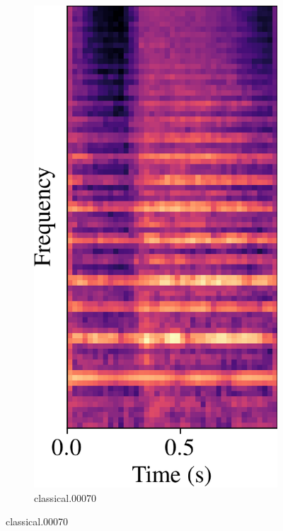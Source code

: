\documentclass[conference]{IEEEtran}
\begin{document}
\begin{figure}[htbp]
    \centering
    \begin{subfigure}[b]{0.32\columnwidth}
        \centerline{\includegraphics[width=\columnwidth]{spec_correct.png}}
        \caption{classical.00070}
        \label{spec_correct}

\end{subfigure}
\end{figure}
\end{document}
